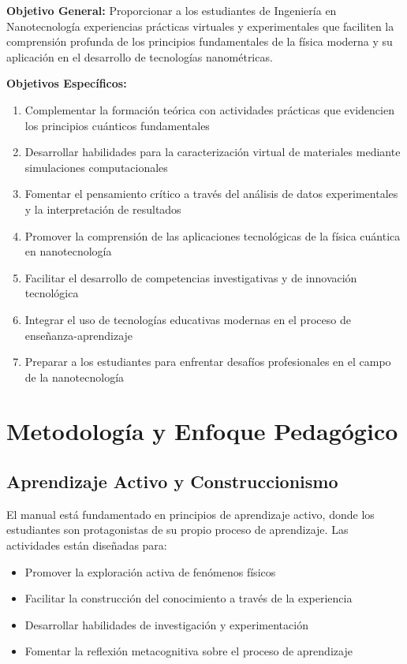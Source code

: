 \documentclass[12pt,a4paper]{book}
\begin{document}
	\begin{objetivobox}
		\textbf{Objetivo General:}
		Proporcionar a los estudiantes de Ingeniería en Nanotecnología experiencias prácticas virtuales y experimentales que faciliten la comprensión profunda de los principios fundamentales de la física moderna y su aplicación en el desarrollo de tecnologías nanométricas.
		
		\textbf{Objetivos Específicos:}
		\begin{enumerate}
			\item Complementar la formación teórica con actividades prácticas que evidencien los principios cuánticos fundamentales
			\item Desarrollar habilidades para la caracterización virtual de materiales mediante simulaciones computacionales
			\item Fomentar el pensamiento crítico a través del análisis de datos experimentales y la interpretación de resultados
			\item Promover la comprensión de las aplicaciones tecnológicas de la física cuántica en nanotecnología
			\item Facilitar el desarrollo de competencias investigativas y de innovación tecnológica
			\item Integrar el uso de tecnologías educativas modernas en el proceso de enseñanza-aprendizaje
			\item Preparar a los estudiantes para enfrentar desafíos profesionales en el campo de la nanotecnología
		\end{enumerate}
	\end{objetivobox}
	
	\section{Metodología y Enfoque Pedagógico}
	
	\subsection{Aprendizaje Activo y Construccionismo}
	
	El manual está fundamentado en principios de aprendizaje activo, donde los estudiantes son protagonistas de su propio proceso de aprendizaje. Las actividades están diseñadas para:
	
	\begin{itemize}
		\item Promover la exploración activa de fenómenos físicos
		\item Facilitar la construcción del conocimiento a través de la experiencia
		\item Desarrollar habilidades de investigación y experimentación
		\item Fomentar la reflexión metacognitiva sobre el proceso de aprendizaje
	\end{itemize}
	
\end{document}
